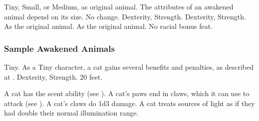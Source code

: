  Tiny, Small, or Medium, as original animal.
 The attributes of an awakened animal depend on its size.
 No change.
  Dexterity,  Strength.
  Dexterity,  Strength.
 As the original animal.
 As the original animal.
 No racial bonus feat.

\subsubsection{Sample Awakened Animals}


 Tiny. As a Tiny character, a cat gains several benefits and penalties, as described at .
  Dexterity,  Strength.
 20 feet.
\begin{itemize}
     A cat has the scent ability (see ).
     A cat's paws end in claws, which it can use to attack (see ). A cat's claws do 1d3 damage.
     A cat treats sources of light as if they had double their normal illumination range.
\end{itemize}

\begin{comment}
\subsection{Changeling}

\parhead{Size} Medium.
\parhead{Attributes} No change.
\parhead{Speed} 30 feet.
\parhead{Special Abilities}
\begin{itemize}
    \itemhead{Alter Shape} A changeling can alter its physical form in minor ways. It gains a \plus10 bonus on Disguise checks, and it can disguise its body as a standard action. This ability does not alter the changeling's equipment, which may give away its identity unless disguised normally.
\end{itemize}
\parhead{Racial Bonus Feat} Any one from the following list: Open Minded, Skill Focus (Bluff, Disguise, Intimidate, Persuasion, or Sense Motive).
\parhead{Automatic Languages} Common and any one language (except Druidic).
\parhead{Bonus Languages} Any.
\end{comment}

